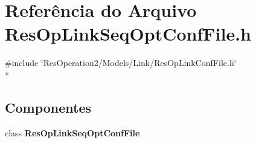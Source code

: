 \section{Referência do Arquivo Res\+Op\+Link\+Seq\+Opt\+Conf\+File.\+h}
\label{_res_op_link_seq_opt_conf_file_8h}
{\ttfamily \#include \char`\"{}Res\+Operation2/\+Models/\+Link/\+Res\+Op\+Link\+Conf\+File.\+h\char`\"{}}\\*
\subsection*{Componentes}
\begin{DoxyCompactItemize}
\item 
class {\bf Res\+Op\+Link\+Seq\+Opt\+Conf\+File}
\end{DoxyCompactItemize}
